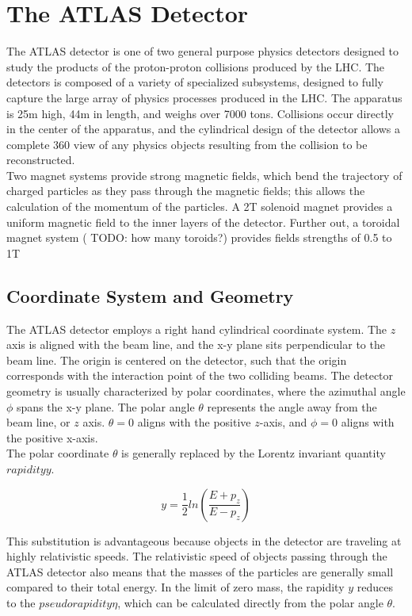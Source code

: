 \chapter{The ATLAS Detector}

The ATLAS detector is one of two general purpose physics detectors designed to study the products of the proton-proton collisions produced by the LHC. The detectors is composed of a variety of specialized subsystems, designed to fully capture the large array of physics processes produced in the LHC. The apparatus is 25m high, 44m in length, and weighs over 7000 tons. Collisions occur directly in the center of the apparatus, and the cylindrical design of the detector allows a complete 360 view of any physics objects resulting from the collision to be reconstructed. \\

Two magnet systems provide strong magnetic fields, which bend the trajectory of charged particles as they pass through the magnetic fields; this allows the calculation of the momentum of the particles. A 2T solenoid magnet provides a uniform magnetic field to the inner layers of the detector. Further out, a toroidal magnet system ( TODO: how many toroids?) provides fields strengths of 0.5 to 1T

\section{Coordinate System and Geometry}

The ATLAS detector employs a right hand cylindrical coordinate system. The $z$ axis is aligned with the beam line, and the x-y plane sits perpendicular to the beam line. The origin is centered on the detector, such that the origin corresponds with the interaction point of the two colliding beams. The detector geometry is usually characterized by polar coordinates, where the azimuthal angle $\phi$ spans the x-y plane. The polar angle $\theta$ represents the angle away from the beam line, or $z$ axis. $\theta = 0$ aligns with the positive $z$-axis, and $\phi = 0$ aligns with the positive x-axis. \\

The polar coordinate $\theta$ is generally replaced by the Lorentz invariant quantity $rapidity y$. 

\begin{equation}
	y = \frac{1}{2} ln(\frac{E+p_z}{E-p_z})
\end{equation}

This substitution is advantageous because objects in the detector are traveling at highly relativistic speeds. The relativistic speed of objects passing through the ATLAS detector also means that the masses of the particles are generally small compared to their total energy. In the limit of zero mass, the rapidity $y$ reduces to the $pseudorapidity \eta$, which can be calculated directly from the polar angle $\theta$.

